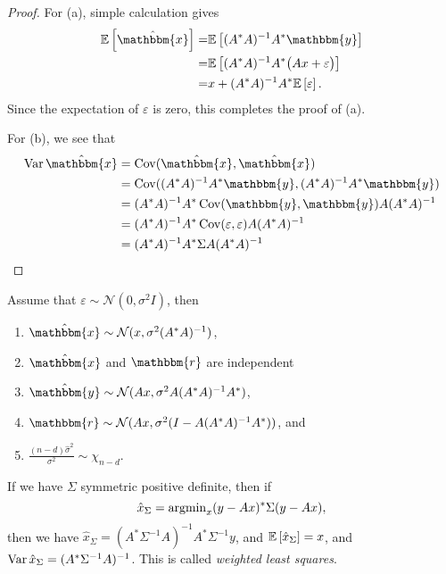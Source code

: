 \documentclass[12pt]{article}
\begin{document}
\begin{proof}
    For (a), simple calculation gives
    \begin{equation*}
        \begin{aligned}
            \E{\hat{\mathbbm{x}}} =& \E{(A^*A)^{-1}A^* \mathbbm{y}}\\
            =& \E{(A^*A)^{-1}A^* \big( Ax + \varepsilon\big)}\\
            =& x + (A^*A)^{-1}A^*  \E{\varepsilon}.
        \end{aligned}
    \end{equation*}
    Since the expectation of $\varepsilon$ is zero, this completes the proof of (a).

    For (b), we see that 
    \begin{equation*}
        \begin{aligned}
            \var \hat{\mathbbm{x}} &= \cov (\hat{\mathbbm{x}},\hat{\mathbbm{x}})\\
            &= \cov((A^*A)^{-1}A^* \mathbbm{y}, (A^*A)^{-1}A^* \mathbbm{y})\\
            &= (A^*A)^{-1}A^*\cov( \mathbbm{y}, \mathbbm{y})A(A^*A)^{-1}\\
            &= (A^*A)^{-1}A^*\cov( \varepsilon, \varepsilon)A(A^*A)^{-1}\\
            &= (A^*A)^{-1}A^*\Sigma A(A^*A)^{-1}
        \end{aligned}
    \end{equation*}
\end{proof}

\begin{theorem}
    Assume that $\varepsilon \sim \mathcal{N}(0,\sigma^2 I)$, then
    \begin{enumerate}[label=(\alph*)]
        \item $\hat{\mathbbm{x}} \sim \mathcal{N}(x,\sigma^2 (A^*A)^{-1})$, 
        \item $\hat{\mathbbm{x}}$ and ${\mathbbm{r}}$ are independent
        \item $\hat{\mathbbm{y}} \sim \mathcal{N}(Ax,\sigma^2 A(A^*A)^{-1}A^*)$, 
        \item ${\mathbbm{r}} \sim \mathcal{N}(Ax,\sigma^2 (I-A(A^*A)^{-1}A^*))$, and
        \item $\frac{(n-d)\hat{\sigma}^2}{\sigma^2} \sim \chi_{n-d}$.
    \end{enumerate}
\end{theorem}

If we have $\Sigma$ symmetric positive definite, then if 
\begin{equation*}
    \hat{x}_\Sigma = \operatorname{argmin}_x (y-Ax)^*\Sigma(y-Ax),
\end{equation*}
then we have $\hat{x}_\Sigma = (A^*\Sigma^{-1}A)^{-1}A^*\Sigma^{-1} y$, and $\mathbb{E} \left[\hat{x}_\Sigma\right] = x$, and $\operatorname{Var} \hat{x}_\Sigma = (A^*\Sigma^{-1}A)^{-1}$. This is called \textit{weighted least squares}. 
\end{document}

